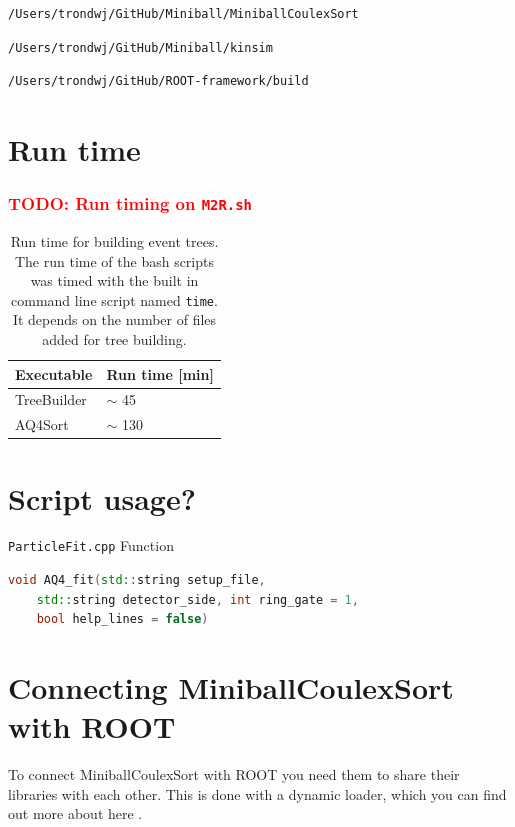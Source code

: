 \documentclass[twoside,english]{uiofysmaster/uiofysmaster}
\begin{document}
\begin{appendices}
\begin{lstlisting}[language=sh]
/Users/trondwj/GitHub/Miniball/MiniballCoulexSort
\end{lstlisting}

\begin{lstlisting}[language=sh]
/Users/trondwj/GitHub/Miniball/kinsim
\end{lstlisting}

\begin{lstlisting}[language=sh]
/Users/trondwj/GitHub/ROOT-framework/build
\end{lstlisting}


\section{Run time}

\subsubsection{\textcolor{red}{TODO: Run timing on \texttt{M2R.sh}}}

\begin{table}[ht] 
	\centering 
	\caption{Run time for building event trees. The run time of the bash scripts was timed with the built in command line script named \texttt{time}. It depends on the number of files added for tree building.}
	\label{tab:run_time}
	\begin{tabular}{ll}
		\hline
		Executable   &  Run time [min] \\
		\hline
		TreeBuilder  &  $\sim$ 45   \\
		AQ4Sort       &  $\sim$ 130  \\
		\hline
	\end{tabular}
\end{table}

\section{Script usage?}

\texttt{ParticleFit.cpp} \newline
Function 
\begin{lstlisting}[language=c++]
void AQ4_fit(std::string setup_file, 
	std::string detector_side, int ring_gate = 1, 
	bool help_lines = false)
\end{lstlisting}



\section{Connecting MiniballCoulexSort with ROOT}
To connect MiniballCoulexSort with ROOT you need them to share their libraries with each other. This is done with a dynamic loader, which you can find out more about here \cite{ROOTdynLoader}. 


\end{appendices}
\end{document}
